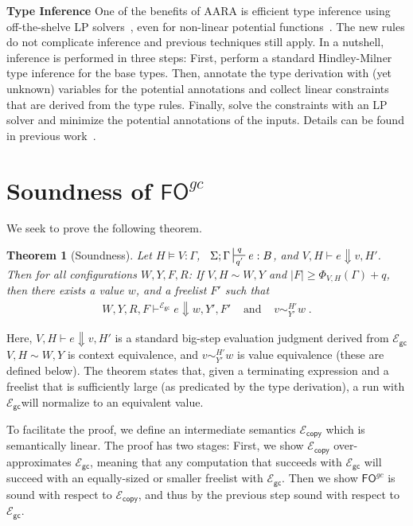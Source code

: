 \documentclass{easychair}
\newtheorem{theorem}{Theorem}
\newcommand{\ms}[1]{\ensuremath{\mathsf{#1}}}
\newcounter{rule}
\newcommand{\veq}[4]{#3 \sim^{#1}_{#2} #4}
\newcommand{\fogc}{\ms{FO}^{gc}}
\newcommand{\gcSem}{\ensuremath{\mathcal{E}_{\ms{gc}}}}
\newcommand{\copySem}{\ensuremath{\mathcal{E}_{\ms{copy}}}}
\theoremstyle{definition}
\begin{document}
{\bf Type Inference} One of the benefits of AARA is efficient type
inference using off-the-shelve LP solvers~\cite{Jost03}, even for
non-linear potential functions~\cite{HoffmannAH10,HoffmannW15}. The
new rules do not complicate inference and previous techniques still
apply. In a nutshell, inference is performed in three steps: First,
perform a standard Hindley-Milner type inference for the base
types. Then, annotate the type derivation with (yet unknown) variables
for the potential annotations and collect linear constraints that are
derived from the type rules. Finally, solve the constraints with an LP
solver and minimize the potential annotations of the inputs. Details
can be found in previous work~\cite{Jost03,HoffmannW15}.



\section{Soundness of $\fogc$}

We seek to prove the following theorem.

\begin{theorem}[Soundness]
\label{itm:soundness} Let $H \vDash V {:} \Gamma$, $\;\; \Sigma; \Gamma \sststile{q'}{q} e : B$,
and $V,H \vdash e \Downarrow v, H'$.
Then for all configurations $W,Y,F,R$:
If $V,H \sim W,Y$ and $|F| \ge \Phi_{V,H}(\Gamma) + q$,
then there exists a value $w$, and a freelist $F'$ such that
$$
\begin{array}{ccc}
	W,Y,R,F \vdash^{\gcSem} e \Downarrow w, Y', F'  & \text{ and } & \veq{H'}{Y'}{v}{w} \; .
\end{array}
$$
\end{theorem}

Here, $V,H \vdash e \Downarrow v, H'$ is a standard big-step evaluation judgment
derived from \gcSem{} $V,H \sim W,Y$ is context equivalence, and $\veq{H'}{Y'}{v}{w}$ is value equivalence 
(these are defined below). The theorem states that,
given a terminating expression
and a freelist that is sufficiently large (as predicated by the type derivation), 
a run with \gcSem will normalize to an equivalent value.

To facilitate the proof, we define an intermediate semantics
\copySem{} which is semantically linear. The proof has two stages:
First, we show \copySem{} over-approximates \gcSem, meaning that any
computation that succeeds with \gcSem{} will succeed with an
equally-sized or smaller freelist with \gcSem{}. Then we show $\fogc$
is sound with respect to \copySem{}, and thus by the previous step sound with respect to
\gcSem{}.
\end{document}
